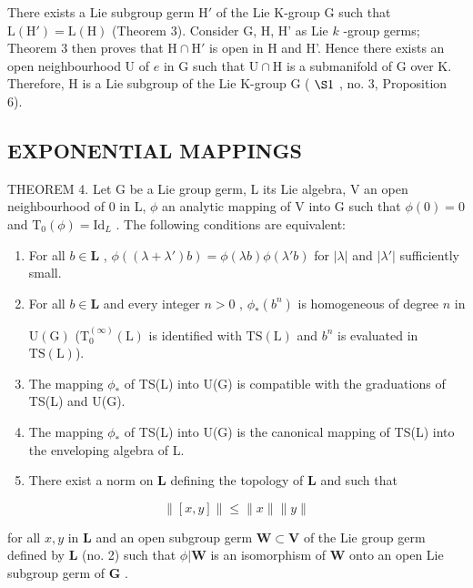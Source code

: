 There exists a Lie subgroup germ \(\mathrm{H}'\) of the Lie K-group G such that \(\mathrm{L}(\mathrm{H}') = \mathrm{L}(\mathrm{H})\) (Theorem 3). Consider G, H, H' as Lie \(k\) -group germs; Theorem 3 then proves that \(\mathrm{H} \cap \mathrm{H}'\) is open in H and H'. Hence there exists an open neighbourhood U of \(e\) in G such that \(\mathrm{U} \cap \mathrm{H}\) is a submanifold of G over K. Therefore, H is a Lie subgroup of the Lie K-group G ( \(\S 1\) , no. 3, Proposition 6).

\subsection{EXPONENTIAL MAPPINGS}

THEOREM 4. Let G be a Lie group germ, L its Lie algebra, V an open neighbourhood of 0 in L, \(\phi\) an analytic mapping of V into G such that \(\phi(0) = 0\) and \(\mathrm{T}_0(\phi) = \mathrm{Id}_L\) . The following conditions are equivalent:

\begin{enumerate}
\def\labelenumi{(\roman{enumi})}
\item
  For all \(b \in \mathbf{L}\) , \(\phi((\lambda + \lambda')b) = \phi(\lambda b)\phi(\lambda'b)\) for \(|\lambda|\) and \(|\lambda'|\) sufficiently small.
\item
  For all \(b \in \mathbf{L}\) and every integer \(n > 0\) , \(\phi_{*}(b^{n})\) is homogeneous of degree \(n\) in

\(\mathrm{U}(\mathrm{G})\) (\(\mathrm{T}_{0}^{(\infty)}(\mathrm{L})\) is identified with \(\mathrm{TS}(\mathrm{L})\) and \(b^{n}\) is evaluated in \(\mathrm{TS}(\mathrm{L})\)).

\item
  The mapping \(\phi_{*}\) of TS(L) into U(G) is compatible with the graduations of TS(L) and U(G).
\item
  The mapping \(\phi_*\) of TS(L) into U(G) is the canonical mapping of TS(L) into the enveloping algebra of L.
\item
  There exist a norm on \(\mathbf{L}\) defining the topology of \(\mathbf{L}\) and such that
\end{enumerate}

\[
\| [ x, y ] \| \leqslant \| x \| \| y \|
\]

for all \(x, y\) in \(\mathbf{L}\) and an open subgroup germ \(\mathbf{W} \subset \mathbf{V}\) of the Lie group germ defined by \(\mathbf{L}\) (no. 2) such that \(\phi | \mathbf{W}\) is an isomorphism of \(\mathbf{W}\) onto an open Lie subgroup germ of \(\mathbf{G}\) .

